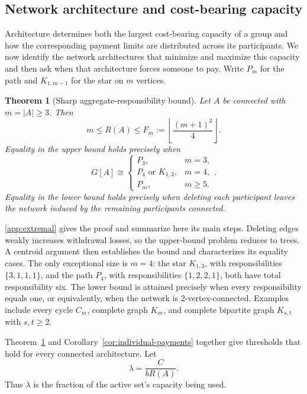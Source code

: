 \documentclass[preprint,12pt,authoryear]{elsarticle}
\newtheorem{theorem}{Theorem}
\begin{document}
\FloatBarrier

\subsection{Network architecture and cost-bearing capacity}
\label{subsec:architecture}

Architecture determines both the largest cost-bearing capacity of a group and
how the corresponding payment limits are distributed across its participants.
We now identify the network architectures that minimize
and maximize this capacity and then ask when
that architecture forces someone to pay. Write \(P_m\) for the path and
\(K_{1,m-1}\) for the star on \(m\) vertices.



\begin{theorem}[Sharp aggregate-responsibility bound]
\label{thm:graph-bound}
Let \(A\) be connected with \(m=|A|\geq3\). Then
\begin{equation}
 m\leq R(A)\leq
 F_m:=\left\lfloor\frac{(m+1)^2}{4}\right\rfloor.
 \label{eq:R-bound}
\end{equation}
Equality in the upper bound holds precisely when
\[
 G[A]\cong
 \begin{cases}
 P_3,&m=3,\\
 P_4\text{ or }K_{1,3},&m=4,\\
 P_m,&m\geq5.
 \end{cases}.
\]
Equality in the lower bound holds precisely when deleting each participant
leaves the network induced by the remaining participants connected.
\end{theorem}

\ref{app:extremal} gives the proof and summarize here its main steps. Deleting edges weakly increases
withdrawal losses, so the upper-bound problem reduces to trees. A centroid
argument then establishes the bound and characterizes its equality cases. The
only exceptional size is \(m=4\): the star \(K_{1,3}\), with responsibilities
\(\{3,1,1,1\}\), and the path \(P_4\), with responsibilities
\(\{1,2,2,1\}\), both have total responsibility six. The lower bound is
attained precisely when every responsibility equals one, or equivalently,
when the network is 2-vertex-connected. Examples include every cycle \(C_m\),
complete graph \(K_m\), and complete bipartite graph \(K_{s,t}\) with
\(s,t\geq2\). 




Theorem~\ref{thm:graph-bound} and Corollary~\ref{cor:individual-payments}
together give thresholds that hold for every connected architecture. Let
\[
 \lambda=\frac{C}{bR(A)}.
\]
Thus \(\lambda\) is the fraction of the active set's capacity being used.
\end{document}
